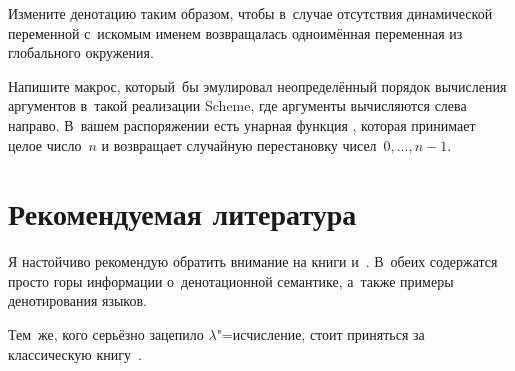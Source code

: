 \begin{exercise}\label{denotational/ex:dynamic-fallback}
Измените денотацию  таким образом, чтобы в~случае отсутствия
динамической переменной с~искомым именем возвращалась одноимённая переменная
из глобального окружения.
\end{exercise}

\begin{exercise}\label{denotational/ex:quantum}
Напишите макрос, который~бы эмулировал неопределённый порядок вычисления
аргументов в~такой реализации Scheme, где аргументы вычисляются слева направо.
В~вашем распоряжении есть унарная функция , которая
принимает целое число~$n$ и возвращает случайную перестановку
чисел~$0, \dots, n - 1$.
\end{exercise}


\section*{Рекомендуемая литература}

Я настойчиво рекомендую обратить внимание на книги \cite{sto77} и~\cite{sch86}.
В~обеих содержатся просто горы информации о~денотационной семантике, а~также
примеры денотирования языков.

Тем~же, кого серьёзно зацепило $\lambda$"=исчисление, стоит приняться за
классическую книгу~\cite{bar84}.

\endgroup %
